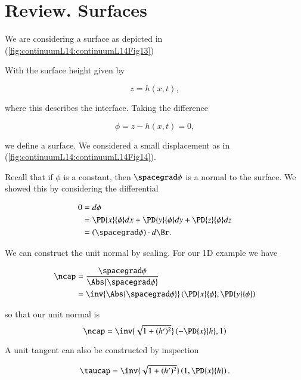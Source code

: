 \section{Review.  Surfaces}

We are considering a surface as depicted in (\ref{fig:continuumL14:continuumL14Fig13})


With the surface height given by

\begin{equation}\label{eqn:continuumL14:10}
z = h(x, t),
\end{equation}

where this describes the interface.  Taking the difference

\begin{equation}\label{eqn:continuumL14:30}
\phi = z - h(x, t) = 0,
\end{equation}

we define a surface.  We considered a small displacement as in (\ref{fig:continuumL14:continuumL14Fig14}).


Recall that if $\phi$ is a constant, then $\spacegrad \phi$ is a normal to the surface.  We showed this by considering the differential

\begin{align*}
0 
&= d\phi \\
&= 
\PD{x}{\phi} dx
+\PD{y}{\phi} dy
+\PD{z}{\phi} dz \\
&=
(\spacegrad \phi) \cdot d\Br.
\end{align*}

We can construct the unit normal by scaling.  For our 1D example we have

\begin{align*}
\ncap 
&= \frac{\spacegrad \phi}{\Abs{\spacegrad \phi}} \\
&= \inv{\Abs{\spacegrad \phi}} 
\left(
\PD{x}{\phi},
\PD{y}{\phi}
\right) 
\end{align*}

so that our unit normal is
\begin{equation}\label{eqn:continuumL14:50}
\ncap 
= \inv{ \sqrt{1 + (h')^2}}
\left( -\PD{x}{h}, 1 \right)
\end{equation}

A unit tangent can also be constructed by inspection

\begin{equation}\label{eqn:continuumL14:70}
\taucap 
= \inv{ \sqrt{1 + (h')^2}}
\left( 1, \PD{x}{h} \right).
\end{equation}
